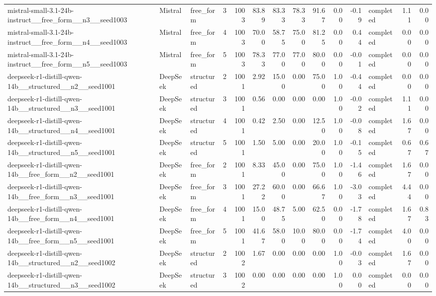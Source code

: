 \begin{longtable}{lllrrrrrrrrlrr}
mistral-small-3.1-24b-instruct\_\_free\_form\_\_n3\_\_seed1003 & Mistral & free\_form & 3 & 1003 & 83.89 & 83.33 & 78.33 & 91.67 & 0.00 & -0.19 & completed & 1.11 & 0.00 \\
mistral-small-3.1-24b-instruct\_\_free\_form\_\_n4\_\_seed1003 & Mistral & free\_form & 4 & 1003 & 70.00 & 58.75 & 75.00 & 81.25 & 0.00 & 0.44 & completed & 0.00 & 0.00 \\
mistral-small-3.1-24b-instruct\_\_free\_form\_\_n5\_\_seed1003 & Mistral & free\_form & 5 & 1003 & 78.33 & 77.00 & 77.00 & 80.00 & 0.00 & -0.01 & completed & 0.00 & 0.00 \\
deepseek-r1-distill-qwen-14b\_\_structured\_\_n2\_\_seed1001 & DeepSeek & structured & 2 & 1001 & 2.92 & 15.00 & 0.00 & 75.00 & 1.00 & -0.44 & completed & 0.00 & 0.00 \\
deepseek-r1-distill-qwen-14b\_\_structured\_\_n3\_\_seed1001 & DeepSeek & structured & 3 & 1001 & 0.56 & 0.00 & 0.00 & 0.00 & 1.00 & -0.02 & completed & 1.11 & 0.00 \\
deepseek-r1-distill-qwen-14b\_\_structured\_\_n4\_\_seed1001 & DeepSeek & structured & 4 & 1001 & 0.42 & 2.50 & 0.00 & 12.50 & 1.00 & -0.08 & completed & 1.67 & 0.00 \\
deepseek-r1-distill-qwen-14b\_\_structured\_\_n5\_\_seed1001 & DeepSeek & structured & 5 & 1001 & 1.50 & 5.00 & 0.00 & 20.00 & 1.00 & -0.15 & completed & 0.67 & 0.67 \\
deepseek-r1-distill-qwen-14b\_\_free\_form\_\_n2\_\_seed1001 & DeepSeek & free\_form & 2 & 1001 & 8.33 & 45.00 & 0.00 & 75.00 & 1.00 & -1.46 & completed & 1.67 & 0.00 \\
deepseek-r1-distill-qwen-14b\_\_free\_form\_\_n3\_\_seed1001 & DeepSeek & free\_form & 3 & 1001 & 27.22 & 60.00 & 0.00 & 66.67 & 1.00 & -3.03 & completed & 4.44 & 0.00 \\
deepseek-r1-distill-qwen-14b\_\_free\_form\_\_n4\_\_seed1001 & DeepSeek & free\_form & 4 & 1001 & 15.00 & 48.75 & 5.00 & 62.50 & 0.00 & -1.78 & completed & 1.67 & 0.83 \\
deepseek-r1-distill-qwen-14b\_\_free\_form\_\_n5\_\_seed1001 & DeepSeek & free\_form & 5 & 1001 & 41.67 & 58.00 & 10.00 & 80.00 & 0.00 & -1.74 & completed & 4.00 & 0.00 \\
deepseek-r1-distill-qwen-14b\_\_structured\_\_n2\_\_seed1002 & DeepSeek & structured & 2 & 1002 & 1.67 & 0.00 & 0.00 & 0.00 & 1.00 & -0.03 & completed & 1.67 & 0.00 \\
deepseek-r1-distill-qwen-14b\_\_structured\_\_n3\_\_seed1002 & DeepSeek & structured & 3 & 1002 & 0.00 & 0.00 & 0.00 & 0.00 & 1.00 & 0.00 & completed & 0.00 & 0.00 \\

\end{longtable}
